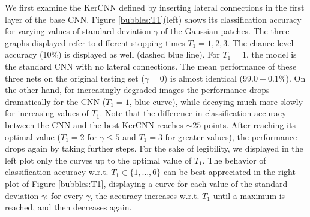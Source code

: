 \documentclass[11pt,oneside,reqno]{amsart}
\begin{document}
 We first examine the KerCNN defined by inserting lateral connections in the first layer of the base CNN. Figure \ref{bubbles:T1}(left) shows its classification accuracy for varying values of standard deviation $\gamma$ of the Gaussian patches. The three graphs displayed refer to different stopping times $T_1=1,2,3$. The chance level accuracy (10\%) is displayed as well (dashed blue line). For $T_1=1$, the model is the standard CNN with no lateral connections. The mean performance of these three nets on the original testing set ($\gamma=0$) is almost identical ($99.0\pm0.1 \%$). On the other hand, for increasingly degraded images the performance drops dramatically for the CNN ($T_1=1$, blue curve), while decaying much more slowly for increasing values of $T_1$. Note that the difference in classification accuracy between the CNN and the best KerCNN reaches $\sim25$ points.
 After reaching its optimal value ($T_1=2$ for $\gamma\leq5$ and $T_1=3$ for greater values), the performance drops again by taking further steps. For the sake of legibility, we displayed in the left plot only the curves up to the optimal value of $T_1$. The behavior of classification accuracy w.r.t. $T_1 \in \{1,\ldots,6\}$ can be best appreciated in the right plot of Figure \ref{bubbles:T1}, displaying a curve for each value of the standard deviation $\gamma$: for every $\gamma$, the accuracy increases w.r.t. $T_1$ until a maximum is reached, and then decreases again.\\
 
\end{document}
